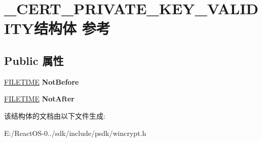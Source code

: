 \hypertarget{struct___c_e_r_t___p_r_i_v_a_t_e___k_e_y___v_a_l_i_d_i_t_y}{}\section{\+\_\+\+C\+E\+R\+T\+\_\+\+P\+R\+I\+V\+A\+T\+E\+\_\+\+K\+E\+Y\+\_\+\+V\+A\+L\+I\+D\+I\+T\+Y结构体 参考}
\label{struct___c_e_r_t___p_r_i_v_a_t_e___k_e_y___v_a_l_i_d_i_t_y}
\subsection*{Public 属性}
\begin{DoxyCompactItemize}
\item 
\mbox{\label{struct___c_e_r_t___p_r_i_v_a_t_e___k_e_y___v_a_l_i_d_i_t_y_a87202ba4187ca576818c33c5f6d03f76}} 
\hyperlink{struct___f_i_l_e_t_i_m_e}{F\+I\+L\+E\+T\+I\+ME} {\bfseries Not\+Before}
\item 
\mbox{\label{struct___c_e_r_t___p_r_i_v_a_t_e___k_e_y___v_a_l_i_d_i_t_y_a4e57ac4d451bf92aafdb8d9318780fbd}} 
\hyperlink{struct___f_i_l_e_t_i_m_e}{F\+I\+L\+E\+T\+I\+ME} {\bfseries Not\+After}
\end{DoxyCompactItemize}


该结构体的文档由以下文件生成\+:\begin{DoxyCompactItemize}
\item 
E\+:/\+React\+O\+S-\/0../sdk/include/psdk/wincrypt.\+h\end{DoxyCompactItemize}
